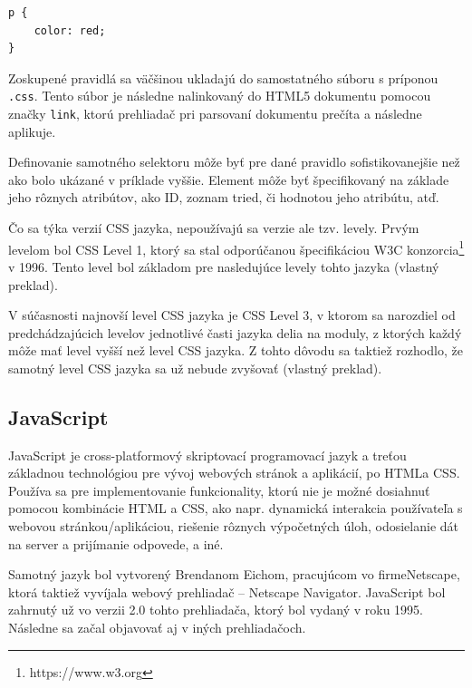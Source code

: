 \begin{minipage}[]{\linewidth}
\begin{verbatim}
p {
    color: red;
}
\end{verbatim}
\end{minipage}

Zoskupené pravidlá sa väčšinou ukladajú do samostatného súboru s príponou \texttt{.css}. Tento súbor je následne nalinkovaný do HTML5 dokumentu pomocou značky \texttt{link}, ktorú prehliadač pri parsovaní dokumentu prečíta a následne aplikuje.

Definovanie samotného selektoru môže byť pre dané pravidlo sofistikovanejšie než ako bolo ukázané v príklade vyššie. Element môže byť špecifikovaný na základe jeho rôznych atribútov, ako ID, zoznam tried, či hodnotou jeho atribútu, atď.

Čo sa týka verzií CSS jazyka, nepoužívajú sa verzie ale tzv. levely. Prvým levelom bol CSS Level 1, ktorý sa stal odporúčanou špecifikáciou W3C konzorcia\footnote{https://www.w3.org} v 1996. Tento level bol základom pre nasledujúce levely tohto jazyka \cite{about_css} (vlastný preklad).

V súčasnosti najnovší level CSS jazyka je CSS Level 3, v ktorom sa narozdiel od predchádzajúcich levelov jednotlivé časti jazyka delia na moduly, z ktorých každý môže mať level vyšší než level CSS jazyka. Z tohto dôvodu sa taktiež rozhodlo, že samotný level CSS jazyka sa už nebude zvyšovať \cite{about_css} (vlastný preklad).

\subsection {JavaScript}
JavaScript je cross-platformový skriptovací programovací jazyk a treťou základnou technológiou pre vývoj webových stránok a aplikácií, po HTML\newline a CSS. Používa sa pre implementovanie funkcionality, ktorú nie je možné dosiahnuť pomocou kombinácie HTML a CSS, ako napr. dynamická interakcia používateľa s webovou stránkou/aplikáciou, riešenie rôznych výpočetných úloh, odosielanie dát na server a prijímanie odpovede, a iné.

Samotný jazyk bol vytvorený Brendanom Eichom, pracujúcom vo firme\newline Netscape, ktorá taktiež vyvíjala webový prehliadač -- Netscape Navigator. \newline JavaScript bol zahrnutý už vo verzii 2.0 tohto prehliadača, ktorý bol vydaný v roku 1995. Následne sa začal objavovať aj v iných prehliadačoch. 

